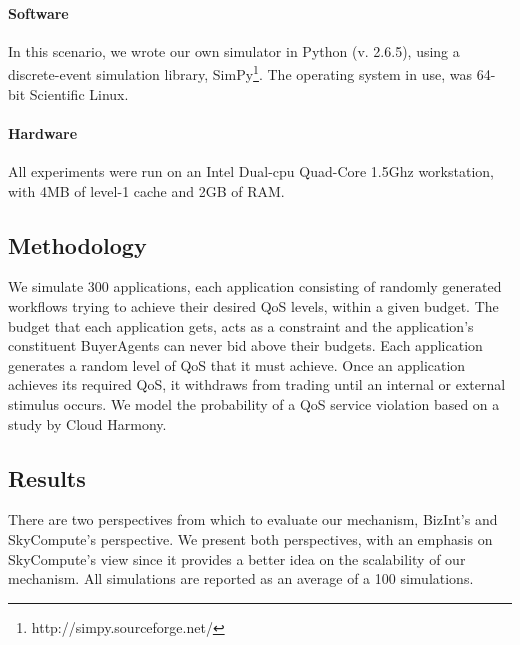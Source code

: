 \documentclass[10pt,journal,compsoc]{IEEEtran}
\begin{document}
\paragraph{Software}
In this scenario, we wrote our own simulator in Python (v. 2.6.5), using a discrete-event simulation library, SimPy\footnote{http://simpy.sourceforge.net/}. The operating system in use, was 64-bit Scientific Linux.
\paragraph{Hardware}
All experiments were run on an Intel Dual-cpu Quad-Core 1.5Ghz workstation, with 4MB of level-1 cache and 2GB of RAM.
\subsection{Methodology}
We simulate 300 applications, each application consisting of randomly generated workflows trying to achieve their desired QoS levels, within a given budget. The budget that each application gets, acts as a constraint and the application's constituent BuyerAgents can never bid above their budgets. Each application generates a random level of QoS that it must achieve. Once an application achieves its required QoS, it withdraws from trading until an internal or external stimulus occurs. We model the probability of a QoS service violation based on a study by Cloud Harmony\cite{2011CloudHarmonyStudy}.\\


\subsection{Results}
There are two perspectives from which to evaluate our mechanism, BizInt's and SkyCompute's perspective. We present both perspectives, with an emphasis on SkyCompute's view since it provides a better idea on the scalability of our mechanism. All simulations are reported as an average of a 100 simulations.\\
\end{document}
